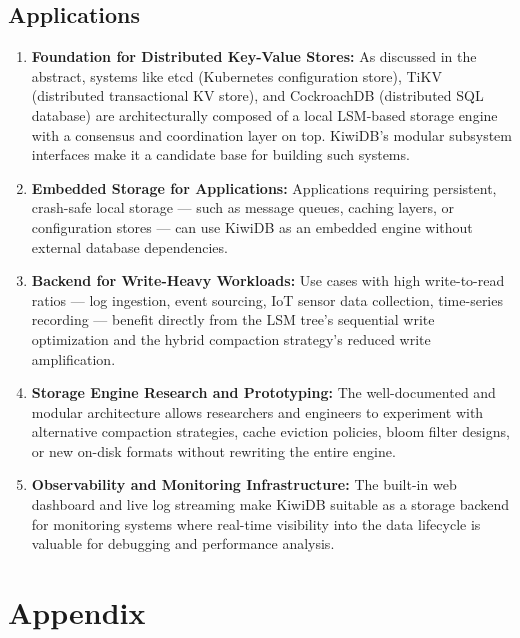 \documentclass[oneside,a4paper,12pt]{book}
\begin{document}
\section{Applications}

\begin{enumerate}[leftmargin=2em]
    \item \textbf{Foundation for Distributed Key-Value Stores:} As discussed in the abstract, systems like etcd (Kubernetes configuration store), TiKV (distributed transactional KV store), and CockroachDB (distributed SQL database) are architecturally composed of a local LSM-based storage engine with a consensus and coordination layer on top. KiwiDB's modular subsystem interfaces make it a candidate base for building such systems.

    \item \textbf{Embedded Storage for Applications:} Applications requiring persistent, crash-safe local storage --- such as message queues, caching layers, or configuration stores --- can use KiwiDB as an embedded engine without external database dependencies.

    \item \textbf{Backend for Write-Heavy Workloads:} Use cases with high write-to-read ratios --- log ingestion, event sourcing, IoT sensor data collection, time-series recording --- benefit directly from the LSM tree's sequential write optimization and the hybrid compaction strategy's reduced write amplification.

    \item \textbf{Storage Engine Research and Prototyping:} The well-documented and modular architecture allows researchers and engineers to experiment with alternative compaction strategies, cache eviction policies, bloom filter designs, or new on-disk formats without rewriting the entire engine.

    \item \textbf{Observability and Monitoring Infrastructure:} The built-in web dashboard and live log streaming make KiwiDB suitable as a storage backend for monitoring systems where real-time visibility into the data lifecycle is valuable for debugging and performance analysis.
\end{enumerate}


\chapter{Appendix}
\end{document}

